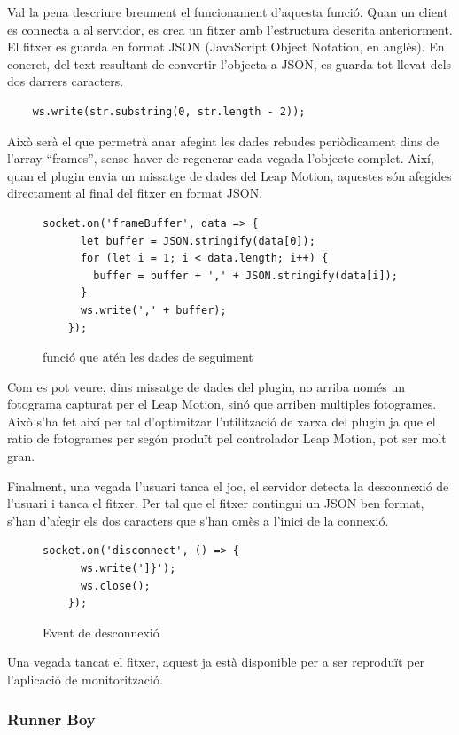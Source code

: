 \documentclass[12pt,a4paper,catalan]{article}
\begin{document}
	Val la pena descriure breument el funcionament d'aquesta funció.
	Quan un client es connecta a al servidor, es crea un fitxer amb l'estructura descrita anteriorment. El fitxer es guarda en format JSON (JavaScript Object Notation, en anglès). En concret, del text resultant de convertir l'objecta a JSON, es guarda tot llevat dels dos darrers caracters.
	\begin{lstlisting}
	ws.write(str.substring(0, str.length - 2));
	\end{lstlisting}
	Això serà el que permetrà anar afegint les dades rebudes periòdicament dins de l'array “frames”, sense haver de regenerar cada vegada l'objecte complet.
	Així, quan el plugin envia un missatge de dades del Leap Motion, aquestes són afegides directament al final del fitxer en format JSON.
	\begin{figure}[H]
	\begin{lstlisting}[]
	socket.on('frameBuffer', data => {
	  let buffer = JSON.stringify(data[0]);
	  for (let i = 1; i < data.length; i++) {
	    buffer = buffer + ',' + JSON.stringify(data[i]);
	  }
	  ws.write(',' + buffer);
	});
	\end{lstlisting}
		\caption{funció que atén les dades de seguiment}
		\label{fig:socket-frame-data}
	\end{figure}
	Com es pot veure, dins missatge de dades del plugin, no arriba només un fotograma capturat per el Leap Motion, sinó que arriben multiples fotogrames. Això s'ha fet així per tal d'optimitzar l'utilització de xarxa del plugin ja que el ratio de fotogrames per segón produït pel controlador Leap Motion, pot ser molt gran.
	
	Finalment, una vegada l'usuari tanca el joc, el servidor detecta la desconnexió de l'usuari i tanca el fitxer. Per tal que el fitxer contingui un JSON ben format, s'han d'afegir els dos caracters que s'han omès a l'inici de la connexió.
	\begin{figure}[H]
	\begin{lstlisting}[]
	socket.on('disconnect', () => {
	  ws.write(']}');
	  ws.close();
	});
	\end{lstlisting}
		\caption{Event de desconnexió}
		\label{fig:socket-disconnect}
	\end{figure}
	Una vegada tancat el fitxer, aquest ja està disponible per a ser reproduït per l'aplicació de monitorització.
	\subsubsection{Runner Boy}
\end{document}
